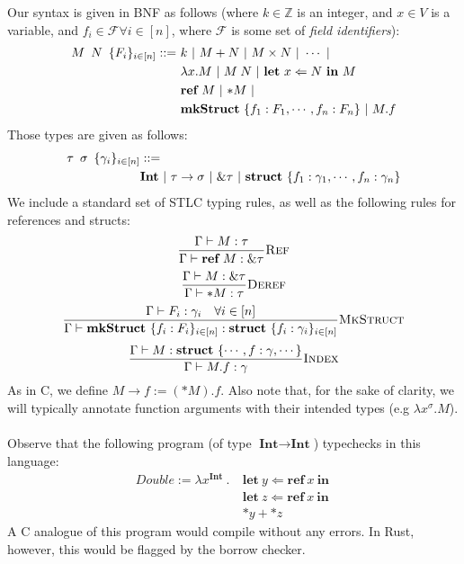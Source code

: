 \documentclass{article}
\newcommand{\agap}{\hspace{0.25em}}
\newcommand{\mkref}{\textbf{ref}~}
\newcommand{\deref}{\mathbf{*}}
\begin{document}
Our syntax is given in BNF as follows (where $k \in \mathbb{Z}$ is an integer, and $x \in V$ is a variable, and $f_i \in \mathcal{F} \forall i \in [n]$, where $\mathcal{F}$ is some set of \emph{field identifiers}):
\begin{align*}
    M \hspace{0.5em} N \hspace{0.5em} \{F_i\}_{i \in [n]} ::=~ &k ~|~ M + N ~|~ M \times N ~|~ \cdots ~|~\\ 
    &\lambda x . M ~|~ M \agap N ~|~ \textbf{let}~ x \Leftarrow N ~\textbf{in}~ M\\
    &\mkref M ~|~ \deref M ~|~\\
    &\textbf{mkStruct} ~\{ f_1 : F_1, \cdots, f_n : F_n \} ~|~ M.f
\end{align*}
Those types are given as follows:
\begin{align*}
    \tau \hspace{0.5em} \sigma \hspace{0.5em} \{ \gamma_i \}_{i \in [n]} &::=\\ 
    &\textbf{Int} ~|~ \tau \rightarrow \sigma ~|~ \& \tau ~|~ \textbf{struct} ~\{ f_1 :  \gamma_1, \cdots, f_n : \gamma_n\}
\end{align*}
We include a standard set of STLC typing rules, as well as the following rules for references and structs:
\begin{equation*}
    \frac{\Gamma \vdash M : \tau}{\Gamma \vdash \mkref M : \& \tau}\textsc{Ref}
\end{equation*}
\begin{equation*}
    \frac{\Gamma \vdash M : \& \tau}{\Gamma \vdash \deref M : \tau}\textsc{Deref}
\end{equation*}
\begin{equation*}
    \frac{\Gamma \vdash F_i : \gamma_i \hspace{1em} \forall i \in [n]}{\Gamma \vdash \textbf{mkStruct} ~\{ f_i : F_i \}_{i \in [n]} : \textbf{struct} ~\{ f_i : \gamma_i \}_{i \in [n]} }\textsc{MkStruct}
\end{equation*}
\begin{equation*}
    \frac{\Gamma \vdash M : \textbf{struct} ~\{ \cdots, f : \gamma, \cdots \}}{\Gamma \vdash M.f : \gamma }\textsc{Index}
\end{equation*}
As in C, we define $M \!\! \rightarrow \!\! f := (*M).f$. Also note that, for the sake of clarity, we will typically annotate function arguments with their intended types (e.g $\lambda x^\sigma . M$).
\\~\\
Observe that the following program (of type $\textbf{Int} \rightarrow \textbf{Int}$) typechecks in this language:
\begin{align*}
    Double := \lambda x^{\textbf{Int}} ~.~ &\textbf{let}~ y \Leftarrow \mkref x ~\textbf{in}~\\ 
    &\textbf{let}~ z \Leftarrow \mkref x ~\textbf{in}~\\ 
    &\deref y + \deref z
\end{align*}
A C analogue of this program would compile without any errors. In Rust, however, this would be flagged by the borrow checker. 
\end{document}

